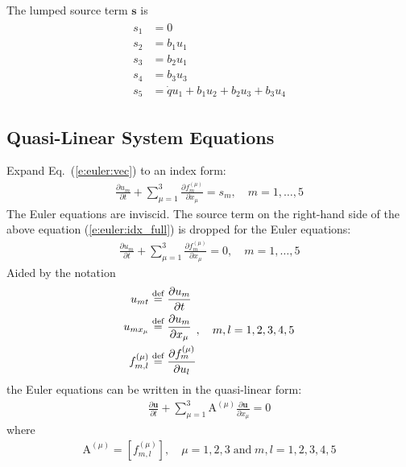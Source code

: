\documentclass{turgon}
\begin{document}
%
The lumped source term $\mathbf{s}$ is
\begin{align}
  \begin{aligned}
    s_1 &= 0 \\
    s_2 &= b_1 u_1 \\
    s_3 &= b_2 u_1 \\
    s_4 &= b_3 u_3 \\
    s_5 &= \dot{q}u_1 + b_1 u_2 + b_2 u_3 + b_3 u_4
  \end{aligned}
  \label{e:euler:sterm}
\end{align}

\subsection{Quasi-Linear System Equations}

Expand Eq.~(\ref{e:euler:vec}) to an index form:
%
\begin{align}
  \frac{\partial u_m}{\partial t}
  + \sum_{\mu=1}^3 \frac{\partial f^{(\mu)}_m}{\partial x_{\mu}}
  = s_m, \quad m = 1, \ldots, 5
  \label{e:euler:idx_full}
\end{align}
%
The Euler equations are inviscid.
The source term on the right-hand side of the above equation
(\ref{e:euler:idx_full}) is dropped for the Euler equations:
%
\begin{align}
  \frac{\partial u_m}{\partial t}
  + \sum_{\mu=1}^3 \frac{\partial f^{(\mu)}_m}{\partial x_{\mu}}
  = 0, \quad m = 1, \ldots, 5
  \label{e:euler:idx}
\end{align}
%
Aided by the notation
%
\begin{align*}
  \begin{aligned}
    u_{mt} &\defeq \frac{\partial u_m}{\partial t} \\
    u_{mx_{\mu}} &\defeq \frac{\partial u_m}{\partial x_{\mu}} \\
    f^{(\mu)}_{m,l} &\defeq \frac{\partial f^{(\mu)}_m}{\partial u_l}
  \end{aligned},
  \quad m, l = 1, 2, 3, 4, 5
\end{align*}
%
the Euler equations can be written in the quasi-linear form:
%
\begin{align}
  \frac{\partial\mathbf{u}}{\partial t} + \sum_{\mu=1}^3
  \mathrm{A}^{(\mu)} \frac{\partial\mathbf{u}}{\partial x_{\mu}} = 0
  \label{e:euler:qlinear}
\end{align}
%
where
\begin{align*}
  \mathrm{A}^{(\mu)} = \left[f^{(\mu)}_{m,l}\right],
  \quad \mu = 1, 2, 3 \;\mathrm{and}\; m, l = 1, 2, 3, 4, 5
\end{align*}
\end{document}
